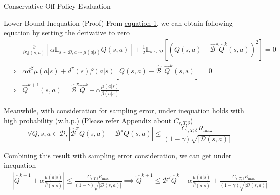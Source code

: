 \documentclass[11pt]{beamer}
\newcommand{\mbb}[1]{\mathbb{#1}}
\newcommand{\mc}[1]{\mathcal{#1}}
\newcommand{\abs}[1]{\left\lvert #1 \right\rvert}
\begin{document}
\begin{frame}{Conservative Off-Policy Evaluation}
  \begin{block}{Lower Bound Inequation (Proof)}
    From \href{eq:1}{equation 1}, we can obtain following equation by setting the derivative to zero
    \begin{equation}
      \begin{aligned}
        &\frac{\partial}{\partial Q(s,a)} \left[\alpha \mbb{E}_{s \sim \mc{D}, a \sim \mu(a|s)}Q(s,a)\right] + \frac{1}{2} \mbb{E}_{s \sim \mc{D}}\left[ \left( Q(s,a) - \hat{\mc{B}}^\pi \hat{Q}^k (s,a)\right)^2\right] =0 \\
        \implies &\alpha d^{\beta} \mu(a|s) + d^\pi (s) \beta(a|s) \left[ Q(s,a) - \hat{\mc{B}}^\pi \hat{Q}^k (s,a)\right] =0 \\
        \implies &\hat{Q}^{k+1} (s,a) = \hat{\mc{B}}^\pi \hat{Q}^k - \alpha \frac{\mu(a|s)}{\beta(a|s)}
      \end{aligned}
    \end{equation}

    Meanwhile, with consideration for sampling error, under inequation holds with high probability (w.h.p.) (Please refer \href{appendix:sampling_error}{Appendix about $C_{r,T,\delta}$})
    \[
      \forall Q,s,a \in \mc{D}, \abs{\hat{\mc{B}}^\pi Q(s,a) - \mc{B}^\pi Q(s,a)} \leq \frac{C_{r,T,\delta} R_{\text{max}}}{(1-\gamma)\sqrt{\abs{\mc{D}(s,a)}}}
    \]

    Combining this result with sampling error consideration, we can get \hypertarget{text:why_assume_overestimation}{under inequation}
    \[
    \begin{aligned}
      &\abs{\hat{Q}^{k+1} + \alpha \frac{\mu(a|s)}{\hat{\beta}(a|s)}} \leq \frac{C_{r,T.\delta}R_{\max}}{(1-\gamma) \sqrt{\abs{\mc{D}(s,a)}}}
      \implies \hat{Q}^{k+1} \leq \mc{B}^\pi \hat{Q}^k - \alpha \frac{\mu(a|s)}{\hat{\beta}(a|s)}  + \frac{C_{r,T,\delta} R_{\text{max}}}{(1- \gamma) \sqrt{\abs{\mc{D}(s,a)}}}
    \end{aligned}
    \]
  \end{block}
\end{frame}
\end{document}
